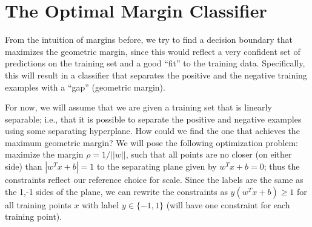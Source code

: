 \documentclass[a4paper]{article}
\begin{document}
%
%
%


\section{The Optimal Margin Classifier}
From the intuition of margins before, we try to find a decision boundary that maximizes the geometric margin, since this would reflect a very confident set of predictions on the training set and a good ``fit'' to the training data. Specifically, this will result in a classifier that separates the positive and the negative training examples with a ``gap'' (geometric margin).

For now, we will assume that we are given a training set that is linearly separable; i.e., that it is possible to separate the positive and negative examples using some separating hyperplane. How could we find the one that achieves the maximum geometric margin? We will pose the following optimization problem: maximize the margin  $\rho = 1/||w||$, such that all points are no closer (on either side) than $|w^Tx+b|=1$ to the separating plane given by $w^Tx+b=0$; thus the constraints reflect our reference choice for scale. Since the labels are the same as the 1,-1 sides of the plane, we can rewrite the constraints as $y(w^Tx+b)\geq1$ for all training points $x$ with label $y\in \{-1,1\}$ (will have one constraint for each training point).
\end{document}
